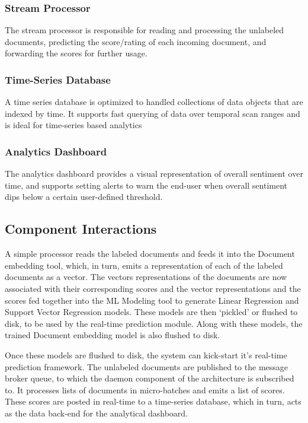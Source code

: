 \documentclass[conference]{IEEEtran}
\begin{document}
        \subsubsection{Stream Processor}
            The stream processor is responsible for reading and processing the unlabeled documents, predicting the score/rating of each incoming document, and forwarding the scores for further usage.

        \subsubsection{Time-Series Database}
            A time series database is optimized to handled collections of data objects that are indexed by time. 
            It supports fast querying of data over temporal scan ranges and is ideal for time-series based analytics

        \subsubsection{Analytics Dashboard}
            The analytics dashboard provides a visual representation of overall sentiment over time, and supports setting alerts to warn the end-user when overall sentiment dips below a certain user-defined threshold.

    \subsection{Component Interactions} \label{Component Interactions}
        A simple processor reads the labeled documents and feeds it into the Document embedding tool, which, in turn, emits a representation of each of the labeled documents as a vector.
        The vectors representations of the documents are now associated with their corresponding scores and the vector representations and the scores fed together into the ML Modeling tool to generate Linear Regression and Support Vector Regression models. 
        These models are then `pickled' or flushed to disk, to be used by the real-time prediction module. 
        Along with these models, the trained Document embedding model is also flushed to disk.

        Once these models are flushed to disk, the system can kick-start it's real-time prediction framework. 
        The unlabeled documents are published to the message broker queue, to which the daemon component of the architecture is subscribed to. 
        It processes lists of documents in micro-batches and emits a list of scores. 
        These scores are posted in real-time to a time-series database, which in turn, acts as the data back-end for the analytical dashboard.
\end{document}
